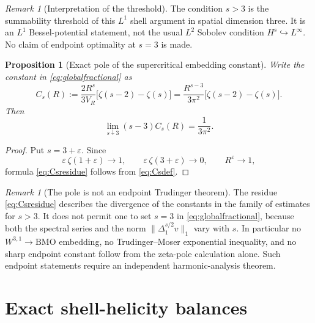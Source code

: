 \documentclass[
 aps,
 prd,
 reprint,
 amsmath,
 amssymb,
 nofootinbib,
 superscriptaddress
]{revtex4-2}
\newtheorem{proposition}[theorem]{Proposition}
\theoremstyle{definition}
\theoremstyle{remark}
\newtheorem{remark}[theorem]{Remark}
\begin{document}
\begin{remark}[Interpretation of the threshold]
The condition $s>3$ is the summability threshold of this $L^1$ shell
argument in spatial dimension three.  It is an $L^1$ Bessel-potential
statement, not the usual $L^2$ Sobolev condition $H^s\hookrightarrow L^\infty$.
No claim of endpoint optimality at $s=3$ is made.
\end{remark}


\begin{proposition}[Exact pole of the supercritical embedding constant]
\label{prop:zetapole}
Write the constant in \eqref{eq:globalfractional} as
\begin{equation}
 C_s(R)
 :=
 \frac{2R^s}{3V_R}
 \bigl[\zeta(s-2)-\zeta(s)\bigr]
 =
 \frac{R^{s-3}}{3\pi^2}
 \bigl[\zeta(s-2)-\zeta(s)\bigr].
 \label{eq:Csdef}
\end{equation}
Then
\begin{equation}
 \boxed{
 \lim_{s\downarrow3}(s-3)C_s(R)
 =
 \frac{1}{3\pi^2}.
 }
 \label{eq:Csresidue}
\end{equation}
\end{proposition}

\begin{proof}
Put $s=3+\varepsilon$.  Since
\[
 \varepsilon\,\zeta(1+\varepsilon)\longrightarrow1,
 \qquad
 \varepsilon\,\zeta(3+\varepsilon)\longrightarrow0,
 \qquad
 R^\varepsilon\longrightarrow1,
\]
formula \eqref{eq:Csresidue} follows from \eqref{eq:Csdef}.
\end{proof}

\begin{remark}[The pole is not an endpoint Trudinger theorem]
The residue \eqref{eq:Csresidue} describes the divergence of the constants
in the family of estimates for $s>3$.  It does not permit one to set
$s=3$ in \eqref{eq:globalfractional}, because both the spectral series and
the norm $\|\Delta_1^{s/2}v\|_1$ vary with $s$.  In particular no
$W^{3,1}\to\mathrm{BMO}$ embedding, no Trudinger--Moser exponential
inequality, and no sharp endpoint constant follow from the zeta-pole
calculation alone.  Such endpoint statements require an independent
harmonic-analysis theorem.
\end{remark}




\section{Exact shell-helicity balances}
\label{sec:helicity}
\end{document}
